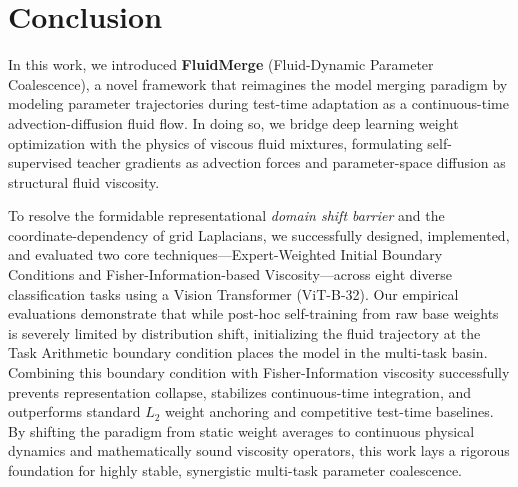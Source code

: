 \section{Conclusion}
\label{sec:conclusion}

In this work, we introduced \textbf{FluidMerge} (Fluid-Dynamic Parameter Coalescence), a novel framework that reimagines the model merging paradigm by modeling parameter trajectories during test-time adaptation as a continuous-time advection-diffusion fluid flow. In doing so, we bridge deep learning weight optimization with the physics of viscous fluid mixtures, formulating self-supervised teacher gradients as advection forces and parameter-space diffusion as structural fluid viscosity.

To resolve the formidable representational \emph{domain shift barrier} and the coordinate-dependency of grid Laplacians, we successfully designed, implemented, and evaluated two core techniques---Expert-Weighted Initial Boundary Conditions and Fisher-Information-based Viscosity---across eight diverse classification tasks using a Vision Transformer (ViT-B-32). Our empirical evaluations demonstrate that while post-hoc self-training from raw base weights is severely limited by distribution shift, initializing the fluid trajectory at the Task Arithmetic boundary condition places the model in the multi-task basin. Combining this boundary condition with Fisher-Information viscosity successfully prevents representation collapse, stabilizes continuous-time integration, and outperforms standard $L_2$ weight anchoring and competitive test-time baselines. By shifting the paradigm from static weight averages to continuous physical dynamics and mathematically sound viscosity operators, this work lays a rigorous foundation for highly stable, synergistic multi-task parameter coalescence.
